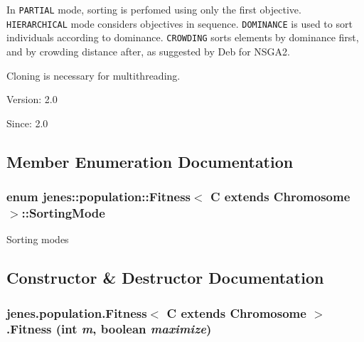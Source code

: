In {\tt PARTIAL} mode, sorting is perfomed using only the first objective. {\tt HIERARCHICAL} mode considers objectives in sequence. {\tt DOMINANCE} is used to sort individuals according to dominance. {\tt CROWDING} sorts elements by dominance first, and by crowding distance after, as suggested by Deb for NSGA2. 

Cloning is necessary for multithreading. 

\begin{Desc}
\item[Version:]2.0 \end{Desc}
\begin{Desc}
\item[Since:]2.0 \end{Desc}


\subsection{Member Enumeration Documentation}
\hypertarget{classjenes_1_1population_1_1_fitness_3_01_c_01extends_01_chromosome_01_4_c870345ce476556f78be491643dbb62d}{
\subsubsection[SortingMode]{\setlength{\rightskip}{0pt plus 5cm}enum jenes::population::Fitness$<$ C extends Chromosome $>$::{\bf SortingMode}}}
\label{classjenes_1_1population_1_1_fitness_3_01_c_01extends_01_chromosome_01_4_c870345ce476556f78be491643dbb62d}


Sorting modes 

\subsection{Constructor \& Destructor Documentation}
\hypertarget{classjenes_1_1population_1_1_fitness_3_01_c_01extends_01_chromosome_01_4_ba60bd43d62c74ca35946ce9c75bff8f}{
\subsubsection[Fitness]{\setlength{\rightskip}{0pt plus 5cm}jenes.population.Fitness$<$ C extends Chromosome $>$.Fitness (int {\em m}, \/  boolean {\em maximize})}}
\label{classjenes_1_1population_1_1_fitness_3_01_c_01extends_01_chromosome_01_4_ba60bd43d62c74ca35946ce9c75bff8f}


